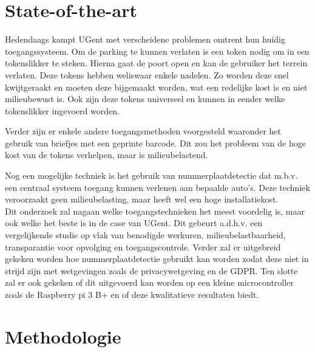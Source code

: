 
\section{State-of-the-art}
\label{sec:state-of-the-art}


Hedendaags kampt UGent met verscheidene problemen omtrent hun huidig toegangssysteem. Om de parking te kunnen verlaten is een token nodig om in een tokenslikker te steken. Hierna gaat de poort open en kan de gebruiker het terrein verlaten. Deze tokens hebben weliswaar enkele nadelen. Zo worden deze snel kwijtgeraakt en moeten deze bijgemaakt worden, wat een redelijke kost is en niet milieubewust is. Ook zijn deze tokens universeel en kunnen in eender welke tokenslikker ingevoerd worden.

Verder zijn er enkele andere toegangsmethoden voorgesteld waaronder het gebruik van briefjes met een geprinte barcode. Dit zou het probleem van de hoge kost van de tokens verhelpen, maar is milieubelastend.

Nog een mogelijke techniek is het gebruik van nummerplaatdetectie dat m.b.v. een centraal systeem toegang kunnen verlenen aan bepaalde auto’s. Deze techniek veroorzaakt geen milieubelasting, maar heeft wel een hoge installatiekost.
\\
Dit onderzoek zal nagaan welke toegangstechnieken het meest voordelig is, maar ook welke het beste is in de case van UGent. Dit gebeurt a.d.h.v. een vergelijkende studie op vlak van benodigde werkuren, milieubelastbaarheid, transparantie voor opvolging en toegangscontrole. Verder zal er uitgebreid gekeken worden hoe nummerplaatdetectie gebruikt kan worden zodat deze niet in strijd zijn met wetgevingen zoals de privacywetgeving en de GDPR. Ten slotte zal er ook gekeken of dit uitgevoerd kan worden op een kleine microcontroller zoals de Raspberry pi 3 B+ en of deze kwalitatieve resultaten biedt.


\section{Methodologie}
\label{sec:methodologie}

